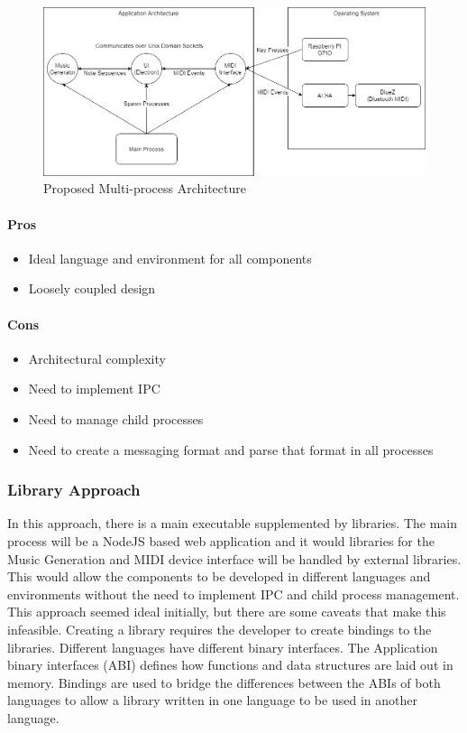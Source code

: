\begin{figure}[h!]
  \centering
  \includegraphics[width=\linewidth]{image/multiprocess.png}
  \caption{Proposed Multi-process Architecture}
  \label{fig:multiprocess}
\end{figure}

\paragraph{Pros}

\begin{itemize}
  \item Ideal language and environment for all components
  \item Loosely coupled design
\end{itemize}

\paragraph{Cons}

\begin{itemize}
  \item Architectural complexity
  \item Need to implement IPC
  \item Need to manage child processes
  \item Need to create a messaging format and parse that format in all processes
\end{itemize}

\subsubsection{Library Approach}

In this approach, there is a main executable supplemented by libraries. The main process
will be a NodeJS based web application and it would libraries for the Music Generation and
MIDI device interface will be handled by external libraries. This would allow the
components to be developed in different languages and environments without the need to
implement IPC and child process management. This approach seemed ideal initially, but
there are some caveats that make this infeasible. Creating a library requires the
developer to create bindings to the libraries. Different languages have different binary
interfaces. The Application binary interfaces (ABI) defines how functions and data
structures are laid out in memory. Bindings are used to bridge the differences between the
ABIs of both languages to allow a library written in one language to be used in another
language.

